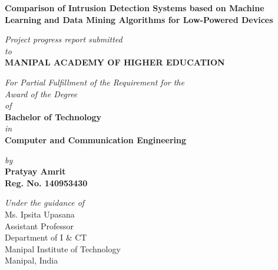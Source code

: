 \documentclass[a4paper,12pt]{article}
\begin{document}
	\begin{titlepage}

		\vspace*{2cm}
		\begin{center}
            \large{\textbf{Comparison of Intrusion Detection Systems based on Machine Learning and Data Mining Algorithms for Low-Powered Devices}}
		\end{center}
		\vspace{0.5cm}
		\begin{center}
            \small{\textit{Project progress report submitted} \\ \vspace{0.25cm} \textit{to} \\ \vspace{0.25cm}\textbf{MANIPAL ACADEMY OF HIGHER EDUCATION} \\}
		\end{center}
		\vspace{0.25cm}
		\begin{center}
		\small{\textit{For Partial Fulfillment of the Requirement for the\\ \vspace{0.25cm}Award of the Degree\\ \vspace{0.25cm}of}} \\ \vspace{0.25cm}
		\textbf{Bachelor of Technology} \\  \vspace{0.25cm} \textit{in} \\ \textbf{Computer and Communication Engineering}
		\end{center}
		\begin{center}
		\small{\textit{by}} \\
		\textbf{Pratyay Amrit} \\ \textbf{Reg. No. 140953430} \\
		\end{center}

		\begin{center}
		\small{\textit{Under the guidance of}} \\
		\renewcommand{\baselinestretch}{1}
		\vspace{0.5cm}
		Ms. Ipsita Upasana \\
		Assistant Professor \\
		Department of I \& CT \\
		 Manipal Institute of Technology \\
		Manipal, India
		\end{center}


\end{titlepage}
\end{document}
